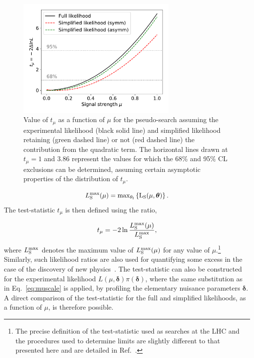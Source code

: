 \documentclass[11pt]{article}
\begin{document}
\begin{figure}[t]
  \centering
  \includegraphics[width=0.7\textwidth]{figures/testtoy-tmuscan}
  \caption{Value of $t_{\mu}$ as a function of $\mu$ for the pseudo-search assuming the experimental likelihood (black solid line) and simplified likelihood retaining (green dashed line) or not (red dashed line) the contribution from the quadratic term. The horizontal lines drawn at $t_{\mu}=1$ and $3.86$ represent the
  values for which the 68\% and 95\% CL exclusions can be determined, assuming certain asymptotic properties of the distribution of $t_{\mu}$.}
  \label{fig:tmucompare}
\end{figure}


\begin{equation}
L_{\rm{S}}^{\rm{max}}(\mu) = \rm{max}_{\theta_{I}}\left\{ L_{\rm{S}}(\mu,\bm{\theta}) \right\}.
\end{equation}
The test-statistic $t_{\mu}$ is then defined using the ratio,

\begin{equation}
t_{\mu} = -2\ln \frac{L_{\rm{S}}^{\rm{max}}(\mu)}{L_{\rm{S}}^{\rm{max}}},
\end{equation}
where $L_{\rm{S}}^{\rm{max}}$ denotes the maximum value of $L_{\rm{S}}^{\rm{max}}(\mu)$ for any value of $\mu$.\footnote{The precise definition of the test-statistic used
as searches at the LHC and the procedures used to determine limits are slightly different to that presented here and are detailed in Ref.~\cite{CMS-NOTE-2011-005}.}
Similarly, such likelihood ratios are also used for quantifying some excess in the case of the discovery
of new physics~\cite{CMS-NOTE-2011-005}.
The test-statistic can also be constructed for the experimental likelihood $L(\mu,\bm{\delta})\pi(\bm{\delta})$, where the same substitution as in Eq.~\eqref{eq:muscale} is applied,
by profiling the elementary
nuisance parameters $\bm{\delta}$. A direct comparison of the test-statistic for the full and simplified likelihoods, as a function of $\mu$, 
is therefore possible.
\end{document}
